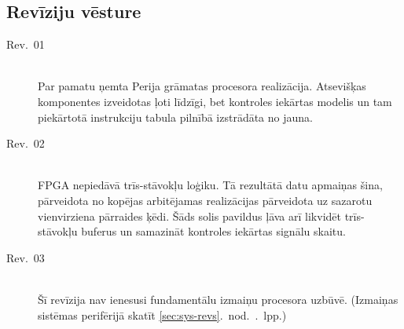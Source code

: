 ﻿\subsection{Revīziju vēsture} \label{sec:cpu-revs}

\begin{description}
	\item[Rev.~01] \hfill \\
		Par pamatu ņemta Perija grāmatas procesora
		realizācija. Atsevišķas komponentes izveidotas ļoti līdzīgi, bet
		kontroles iekārtas modelis un tam piekārtotā instrukciju tabula
		pilnībā izstrādāta no jauna.
	\item[Rev.~02] \hfill \\
		 FPGA nepiedāvā trīs-stāvokļu loģiku.
		Tā rezultātā
		datu apmaiņas šina, pārveidota no kopējas arbitējamas 
		 realizācijas pārveidota uz sazarotu vienvirziena
		pārraides ķēdi. Šāds solis pavildus ļāva arī likvidēt trīs-stāvokļu
		buferus un samazināt kontroles iekārtas signālu skaitu.
	\item[Rev.~03] \hfill \\
		Šī revīzija nav ienesusi fundamentālu izmaiņu procesora uzbūvē.
		(Izmaiņas sistēmas perifērijā skatīt
			\ref{sec:sys-revs}.~nod.~\pageref{sec:sys-revs}.~lpp.)
\end{description}
